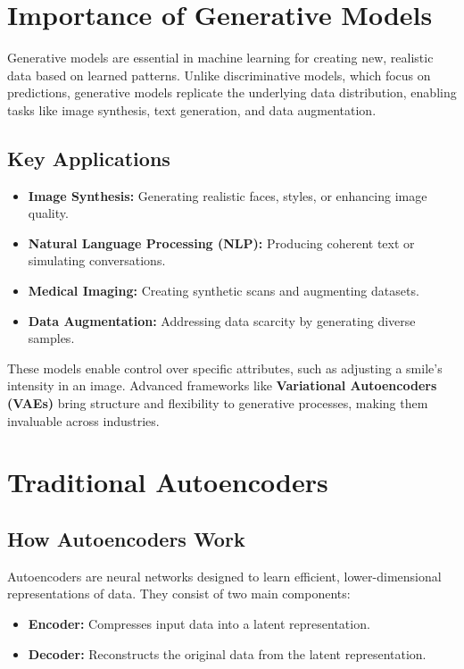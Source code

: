 \documentclass[a4paper,12pt]{article}
\begin{document}

\section{Importance of Generative Models}

Generative models are essential in machine learning for creating new, realistic data based on learned patterns. Unlike discriminative models, which focus on predictions, generative models replicate the underlying data distribution, enabling tasks like image synthesis, text generation, and data augmentation.

\subsection{Key Applications}
\begin{itemize}
    \item \textbf{Image Synthesis:} Generating realistic faces, styles, or enhancing image quality.
    \item \textbf{Natural Language Processing (NLP):} Producing coherent text or simulating conversations.
    \item \textbf{Medical Imaging:} Creating synthetic scans and augmenting datasets.
    \item \textbf{Data Augmentation:} Addressing data scarcity by generating diverse samples.
\end{itemize}

These models enable control over specific attributes, such as adjusting a smile's intensity in an image. Advanced frameworks like \textbf{Variational Autoencoders (VAEs)} bring structure and flexibility to generative processes, making them invaluable across industries.

\section{Traditional Autoencoders}

\subsection{How Autoencoders Work}
Autoencoders are neural networks designed to learn efficient, lower-dimensional representations of data. They consist of two main components:
\begin{itemize}
    \item \textbf{Encoder:} Compresses input data into a latent representation.
    \item \textbf{Decoder:} Reconstructs the original data from the latent representation.
\end{itemize}
\end{document}
